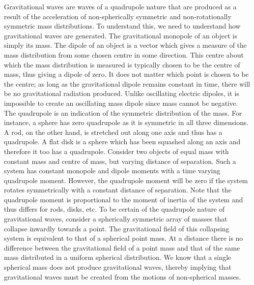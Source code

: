 \documentclass[12pt]{article}
\begin{document}
	\noindent Gravitational waves are waves of a quadrupole nature that are produced as a result of the acceleration of non-spherically symmetric and non-rotationally symmetric mass distributions. To understand this, we need to understand how gravitational waves are generated. The gravitational monopole of an object is simply its mass. The dipole of an object is a vector which gives a measure of the mass distribution from some chosen centre in some direction. This centre about which the mass distribution is measured is typically chosen to be the centre of mass, thus giving a dipole of zero. It does not matter which point is chosen to be the centre; as long as the gravitational dipole remains constant in time, there will be no gravitational radiation produced. Unlike oscillating electric dipoles, it is impossible to create an oscillating mass dipole since mass cannot be negative. The quadrupole is an indication of the symmetric distribution of the mass. For instance, a sphere has zero quadrupole as it is symmetric in all three dimensions. A rod, on the other hand, is stretched out along one axis and thus has a quadrupole. A flat disk is a sphere which has been squashed along an axis and therefore it too has a quadrupole. Consider two objects of equal mass with constant mass and centre of mass, but varying distance of separation. Such a system has constant monopole and dipole moments with a time varying quadrupole moment. However, the quadrupole moment will be zero if the system rotates symmetrically with a constant distance of separation. Note that the quadrupole moment is proportional to the moment of inertia of the system and thus differs for rods, disks, etc. To be certain of the quadrupole nature of gravitational waves, consider a spherically symmetric array of masses that collapse inwardly towards a point. The gravitational field of this collapsing system is equivalent to that of a spherical point mass. At a distance there is no difference between the gravitational field of a point mass and that of the same mass distributed in a uniform spherical distribution. We know that a single spherical mass does not produce gravitational waves, thereby implying that gravitational waves must be created from the motions of non-spherical masses.
	
\end{document}
